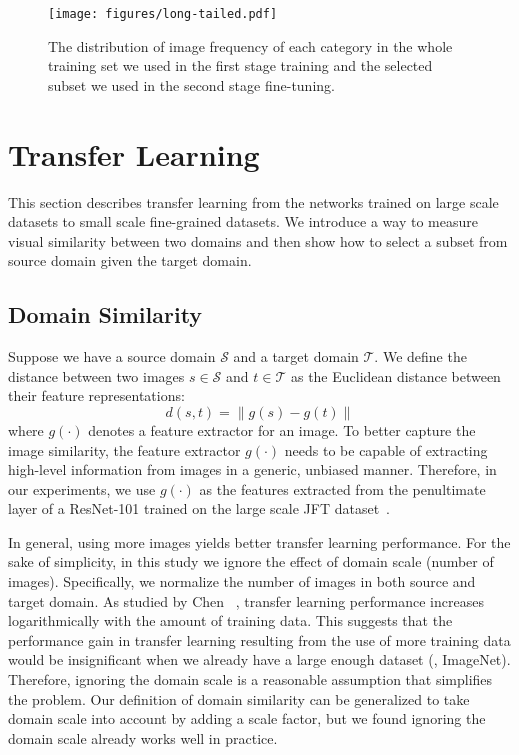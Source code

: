 \documentclass[10pt,twocolumn,letterpaper]{article}
\begin{document}
\begin{figure}[t]
\centering
\texttt{[image: figures/long-tailed.pdf]}
\caption{The distribution of image frequency of each category in the whole training set we used in the first stage training and the selected subset we used in the second stage fine-tuning.}
\label{fig:long-tailed}
\end{figure}




\section{Transfer Learning}
\label{sec:transfer_learning}

This section describes transfer learning from the networks trained on large scale datasets to small scale fine-grained datasets.
We introduce a way to measure visual similarity between two domains and then show how to select a subset from source domain given the target domain.


\subsection{Domain Similarity}
\label{sec:domain_similarity}

Suppose we have a source domain $\mathcal{S}$ and a target domain $\mathcal{T}$.
We define the distance between two images $s \in \mathcal{S}$ and $t \in \mathcal{T}$ as the Euclidean distance between their feature representations:
\begin{equation}
\label{eqn:image_dist}
d(s, t) = \lVert g(s) - g(t) \rVert
\end{equation}
where $g(\cdot)$ denotes a feature extractor for an image.
To better capture the image similarity, the feature extractor $g(\cdot)$ needs to be capable of extracting high-level information from images in a generic, unbiased manner.
Therefore, in our experiments, we use $g(\cdot)$ as the features extracted from the penultimate layer of a ResNet-101 trained on the large scale JFT dataset~\cite{revisiting_data}.

In general, using more images yields better transfer learning performance.
For the sake of simplicity, in this study
we ignore the effect of domain scale (number of images).
Specifically, we normalize the number of images in both source and target domain.
As studied by Chen \etal~\cite{revisiting_data}, transfer learning performance increases logarithmically with the amount of training data.
This suggests that the performance gain in transfer learning resulting from the use of more training data would be insignificant when we already have a large enough dataset (\eg, ImageNet).
Therefore, ignoring the domain scale is a reasonable assumption that simplifies the problem.
Our definition of domain similarity can be generalized to take domain scale into account by adding a scale factor, but we found ignoring the domain scale already works well in practice.
\end{document}
